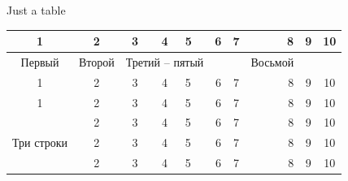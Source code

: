 \documentclass[a4paper,12pt]{article}
\begin{document}
\begin{table}[h]
  \begin{center}
    \begin{caption}{Just a table}\label{tab:mytab}
      \begin{tabular}{|c|c|c|c||l|c|c|r|c|c|}
  		\hline
    	1 & 2 & 3 & 4 & 5 & 6 & 7 & 8 & 9 & 10 \\ \hline
  		Первый & Второй & \multicolumn{3}{|c|}{Третий -- пятый} &   &  & Восьмой &   &  \\ 
		\cline{1-7} \cline{9-10}
   		1 & 2 & 3 & 4 & 5 & 6 & 7 & 8 & 9 & 10 \\ \hline \hline
   		1 & 2 & 3 & 4 & 5 & 6 & 7 & 8 & 9 & 10 \\ \hline
    	\multirow{3}{*}{Три строки}  & 2 & 3 & 4 & 5 & 6 & 7 & 8 & 9 & 10 \\ \cline{2-10}
    	  & 2 & 3 & 4 & 5 & 6 & 7 & 8 & 9 & 10 \\ \cline{2-10}
    	  & 2 & 3 & 4 & 5 & 6 & 7 & 8 & 9 & 10 \\ \hline
      \end{tabular}
    \end{caption}
  \end{center}
\end{table}
\end{document}
